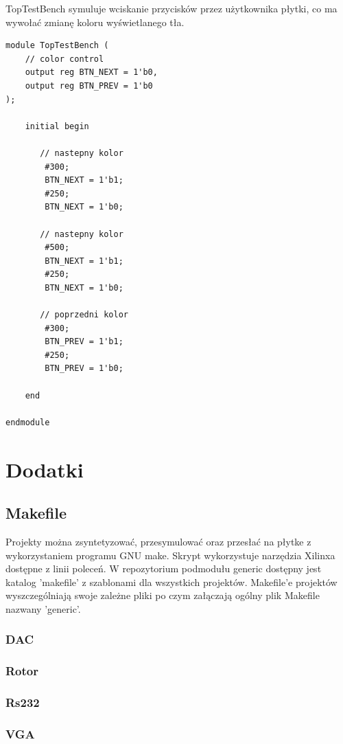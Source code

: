 \documentclass[a4paper,12pt]{article}
\begin{document}
TopTestBench symuluje wciskanie przycisków przez użytkownika płytki, co ma wywołać zmianę koloru wyświetlanego tła.
\begin{lstlisting}[label=Syncvga,caption=Sync.v]
module TopTestBench (
    // color control
    output reg BTN_NEXT = 1'b0,
    output reg BTN_PREV = 1'b0
);

    initial begin

       // nastepny kolor
        #300;
        BTN_NEXT = 1'b1;
        #250;
        BTN_NEXT = 1'b0;

       // nastepny kolor
        #500;
        BTN_NEXT = 1'b1;
        #250;
        BTN_NEXT = 1'b0;

       // poprzedni kolor
        #300;
        BTN_PREV = 1'b1;
        #250;
        BTN_PREV = 1'b0;

    end

endmodule
\end{lstlisting}

\section{Dodatki}

\subsection{Makefile}

Projekty można zsyntetyzować, przesymulować oraz przesłać na płytke z wykorzystaniem programu GNU make. Skrypt wykorzystuje narzędzia Xilinxa dostępne z linii poleceń. W repozytorium podmodułu generic dostępny jest katalog 'makefile' z szablonami dla wszystkich projektów. Makefile'e projektów wyszczególniają swoje zależne pliki po czym załączają ogólny plik Makefile nazwany 'generic'.






\subsubsection{DAC}


\subsubsection{Rotor}


\subsubsection{Rs232}


\subsubsection{VGA}



\linespread{1.3}
\selectfont
\end{document}
